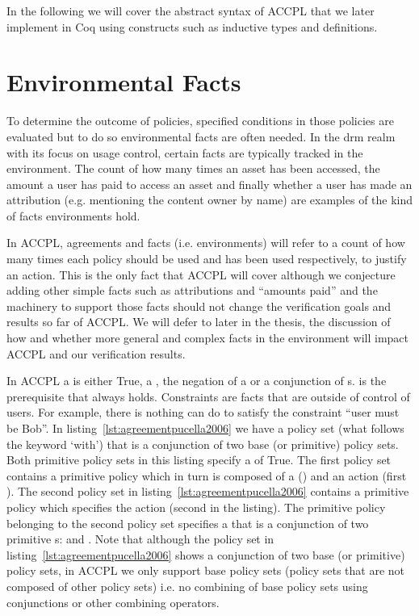 In the following we will cover the abstract syntax of \ac{ACCPL} that we later implement in Coq using constructs such as inductive types and definitions. 

\section{Environmental Facts}\label{sec:odrl0}
To determine the outcome of policies, specified conditions in those policies are evaluated but to do so environmental facts are often needed. In the \ac{drm} realm with its focus on usage control, certain facts are typically tracked in the environment. The count of how many times an asset has been accessed, the amount a user has paid to access an asset and finally whether a user has made an attribution (e.g. mentioning the content owner by name) are examples of the kind of facts environments hold.

In \ac{ACCPL}, agreements and facts (i.e. environments) will refer to a count of how many times each policy should be used and has been used respectively, to justify an action. This is the only fact that \ac{ACCPL} will cover although we conjecture adding other simple facts such as attributions and ``amounts paid'' and the machinery to support those facts should not change the verification goals and results so far of \ac{ACCPL}. We will defer to later in the thesis, the discussion of how and whether more general and complex facts in the environment will impact \ac{ACCPL} and our verification results.   

In \ac{ACCPL} a  is either True, a , the negation of a  or a conjunction of s.  is the prerequisite that always holds. Constraints are facts that are outside of control of users. For example, there is nothing  can do to satisfy the constraint ``user must be Bob''. In listing~\ref{lst:agreementpucella2006} we have a policy set (what follows the keyword `with') that is a conjunction of two base (or primitive) policy sets. Both primitive policy sets in this listing specify a  of True. The first policy set contains a primitive policy which in turn is composed of a  () and an action (first ). The second policy set in listing~\ref{lst:agreementpucella2006} contains a primitive policy which specifies the action  (second  in the listing). The primitive policy belonging to the second policy set specifies a  that is a conjunction of two primitive s:  and . Note that although the policy set in listing~\ref{lst:agreementpucella2006} shows a conjunction of two base (or primitive) policy sets, in \ac{ACCPL} we only support base policy sets (policy sets that are not composed of other policy sets) i.e. no combining of base policy sets using conjunctions or other combining operators. 


